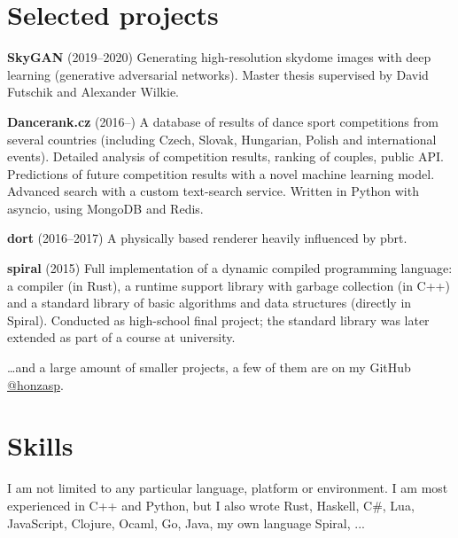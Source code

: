 \documentclass[11pt,a4paper]{article}
\begin{document}
\begin{multicols}{2}
\section*{Selected projects}

\textbf{SkyGAN} (2019–2020)
  \newline Generating high-resolution skydome images with deep learning
  (generative adversarial networks).
  \newline Master thesis supervised by David Futschik and Alexander Wilkie.

\textbf{Dancerank.cz} (2016–)
  \newline A database of results of dance sport competitions from several
  countries (including Czech, Slovak, Hungarian, Polish and international
  events).
  \newline Detailed analysis of competition results, ranking of couples, public API.
  \newline Predictions of future competition results with a novel machine learning model.
  \newline Advanced search with a custom text-search service.
  \newline Written in Python with asyncio, using MongoDB and Redis.

\textbf{dort} (2016–2017)
  \newline A physically based renderer heavily influenced by pbrt.

\textbf{spiral} (2015)
  \newline Full implementation of a dynamic compiled programming language: a
  compiler (in Rust), a runtime support library with garbage collection (in
  C++) and a standard library of basic algorithms and data structures
  (directly in Spiral).
  \newline Conducted as high-school final project; the standard library was
  later extended as part of a course at university.

\ldots{}and a large amount of smaller projects, a few of them are on my GitHub 
\href{https://github.com/honzasp}{@honzasp}.

\section*{Skills}

I am not limited to any particular language, platform or environment. I am most
experienced in C++ and Python, but I also wrote Rust,
{\small Haskell, C\#, Lua,}
{\footnotesize JavaScript,}
{\scriptsize Clojure, Ocaml, Go, Java, my own language Spiral, ...}


\end{multicols}
\end{document}
